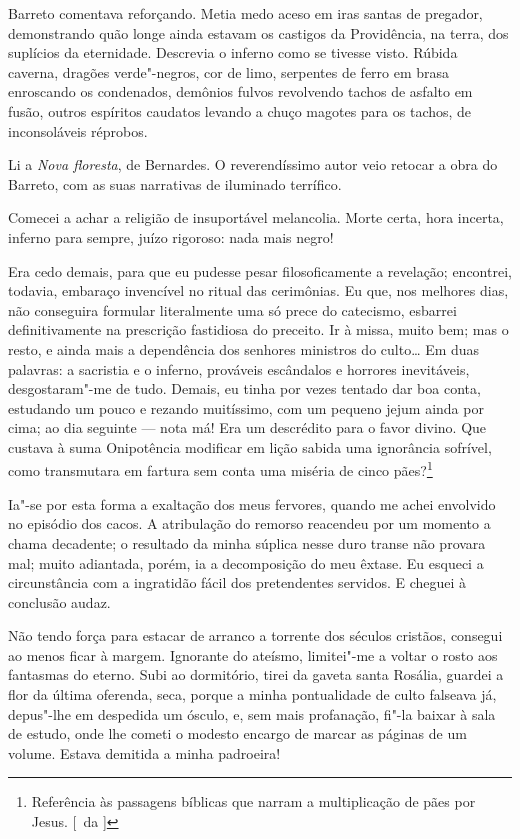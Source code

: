 Barreto comentava reforçando. Metia medo aceso em iras santas de pregador,
demonstrando quão longe ainda estavam os castigos da Providência, na
terra, dos suplícios da eternidade. Descrevia o inferno como se tivesse
visto. Rúbida caverna, dragões verde"-negros, cor de limo, serpentes
de ferro em brasa enroscando os condenados, demônios fulvos revolvendo
tachos de asfalto em fusão, outros espíritos caudatos levando a chuço
magotes para os tachos, de inconsoláveis réprobos. 

Li a \textit{Nova floresta}, de Bernardes. O reverendíssimo autor 
veio retocar a obra do Barreto, com as suas narrativas de iluminado terrífico. 

Comecei a achar a religião de insuportável melancolia. Morte certa, 
hora incerta, inferno para sempre, juízo rigoroso: nada mais negro! 

Era cedo demais, para que
eu pudesse pesar filosoficamente a revelação; encontrei, todavia,
embaraço invencível no ritual das cerimônias. Eu que, nos melhores
dias, não conseguira formular literalmente uma só prece do catecismo,
esbarrei definitivamente na prescrição fastidiosa do preceito. Ir à
missa, muito bem; mas o resto, e ainda mais a dependência dos senhores
ministros do culto\ldots{} Em duas palavras: a sacristia e o inferno,
prováveis escândalos e horrores inevitáveis, desgostaram"-me de tudo.
Demais, eu tinha por vezes tentado dar boa conta, estudando um pouco e
rezando muitíssimo, com um pequeno jejum ainda por cima; ao dia
seguinte --- nota má! Era um descrédito para o favor divino. Que
custava à suma Onipotência modificar em lição sabida uma ignorância
sofrível, como transmutara em fartura sem conta uma miséria de cinco pães?\footnote{ Referência às passagens 
bíblicas que narram a multiplicação de pães por Jesus. [~da ]}

Ia"-se por esta forma a exaltação dos meus fervores, quando me
achei envolvido no episódio dos cacos. A atribulação do remorso
reacendeu por um momento a chama decadente; o resultado da minha
súplica nesse duro transe não provara mal; muito adiantada, porém, ia a
decomposição do meu êxtase. Eu esqueci a circunstância com a ingratidão
fácil dos pretendentes servidos. E cheguei à conclusão audaz. 

Não tendo força para estacar de arranco a torrente dos séculos cristãos, consegui
ao menos ficar à margem. Ignorante do ateísmo, limitei"-me a voltar o
rosto aos fantasmas do eterno. Subi ao dormitório, tirei da gaveta
santa Rosália, guardei a flor da última oferenda, seca, porque a minha
pontualidade de culto falseava já, depus"-lhe em despedida um ósculo,
e, sem mais profanação, fi"-la baixar à sala de estudo, onde lhe
cometi o modesto encargo de marcar as páginas de um volume. Estava
demitida a minha padroeira!

